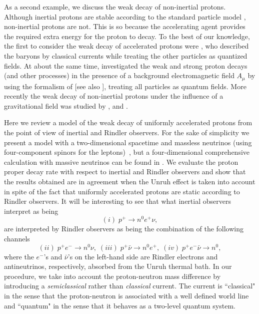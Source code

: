 \documentclass[12pt,nofootinbib,floatfix,aps,prd,showpacs,amsmath,amssymb,eqsecnum]{revtex4-2}
\let\cite\citep
\begin{document}
As a second example, we discuss the weak decay of non-inertial protons. 
Although inertial protons are stable according to the standard 
particle model \cite{PDG}, non-inertial protons are not. This is so because 
the accelerating agent provides the required extra energy for 
the proton to decay. To the best of our knowledge, the first 
to consider the weak decay of accelerated protons were 
\textcite{Ginzburgetal64}, who described the baryons by classical 
currents while treating the other particles as quantized fields. 
At about the same 
time, \textcite{Zharkov65} investigated the weak and strong proton decays 
(and other processes) in the presence of a background electromagnetic field 
$A_\mu$ by using the formalism of 
\textcite{Nikishovetal64,Nikishovetal64b} 
[see also \textcite{Ritus69}], treating all particles as quantum fields.
More recently the weak decay of non-inertial protons under 
the influence of 
a gravitational field was studied by \textcite{Mueller97}, 
\textcite{Vanzellaetal00} and \textcite{Fregolenteetal06}.

Here we review a model of 
the weak decay of uniformly accelerated protons 
from the point of view of inertial and Rindler observers. For the sake 
of simplicity we present a model with 
a two-dimensional spacetime and massless 
neutrinos (using four-component spinors for the 
leptons)~\cite{Vanzellaetal01, Matsasetal99}, but a four-dimensional 
comprehensive calculation with massive neutrinos can be found in 
\textcite{Suzukietal03}. We evaluate the proton proper decay rate with 
respect to inertial and Rindler observers  and show that the results 
obtained are in agreement when the Unruh effect is taken into account 
in spite of the fact that uniformly accelerated protons are static 
according to Rindler observers. It will be interesting to see that 
what inertial observers interpret as being
$$
(i)\; p^+ \to n^0 e^+ \nu,
$$
are interpreted by Rindler observers as being the combination
of the following channels
$$
(ii)\;  p^+ e^- \to  n^0 \nu,\;
(iii)\; p^+ \bar\nu \to  n^0 e^+,\;
(iv)\;  p^+ e^- \bar\nu \to  n^0,
$$
where the $e^-$'s and $\bar \nu$'s on
the left-hand side are Rindler electrons 
and antineutrinos, respectively, absorbed from the Unruh thermal bath.
In our procedure, we take into account the proton-neutron mass difference
by introducing a {\em semiclassical} rather than {\em classical} current.
The current is ``classical" in the sense that the proton-neutron is associated 
with a well defined world line and ``quantum" in the sense that it behaves 
as a two-level quantum system.
\end{document}
